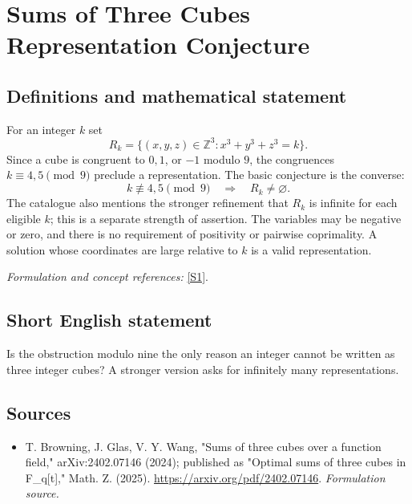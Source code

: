 \documentclass[11pt]{article}
\begin{document}
\section*{\texorpdfstring{Sums of Three Cubes Representation Conjecture}{Sums of Three Cubes Representation Conjecture}}\label{430}
\subsection{Definitions and mathematical statement}
For an integer $k$ set
\[
 R_k=\{(x,y,z)\in{\mathbb{Z}}^3:x^3+y^3+z^3=k\}.
\]
Since a cube is congruent to $0,1$, or $-1$ modulo $9$, the congruences $k\equiv4,5\pmod9$ preclude a representation. The basic conjecture is the converse:
\[
 k\not\equiv4,5\pmod9\quad\Longrightarrow\quad R_k\ne\varnothing.
\]
The catalogue also mentions the stronger refinement that $R_k$ is infinite for each eligible $k$; this is a separate strength of assertion. The variables may be negative or zero, and there is no requirement of positivity or pairwise coprimality. A solution whose coordinates are large relative to $k$ is a valid representation.
\par\smallskip\textit{Formulation and concept references:} \href{https://arxiv.org/pdf/2402.07146}{[S1]}.

\subsection{Short English statement}
Is the obstruction modulo nine the only reason an integer cannot be written as three integer cubes? A stronger version asks for infinitely many representations.
\subsection{Sources}
\begin{itemize}
\item[S1]T. Browning, J. Glas, V. Y. Wang, "Sums of three cubes over a function field," arXiv:2402.07146 (2024); published as "Optimal sums of three cubes in F\_q[t]," Math. Z. (2025).
\url{https://arxiv.org/pdf/2402.07146}.
\textit{Formulation source.}
\end{itemize}
\end{document}
